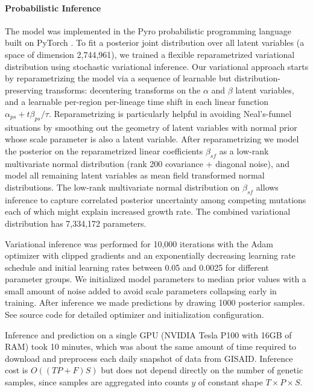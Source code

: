 \documentclass[12pt]{article}
\begin{document}
\paragraph*{Probabilistic Inference}

The model was implemented in the Pyro probabilistic programming language \cite{bingham2019pyro} built on PyTorch \cite{paszke2017automatic}.
To fit a posterior joint distribution over all latent variables (a space of dimension 2,744,961), we trained a flexible reparametrized variational distribution using stochastic variational inference.
Our variational approach starts by reparametrizing the model via a sequence of learnable but distribution-preserving transforms: decentering transforms \cite{gorinova2020automatic} on the $\alpha$ and $\beta$ latent variables, and a learnable per-region per-lineage time shift in each linear function $\alpha_{ps}+t\beta_{ps}/\tau$.
Reparametrizing is particularly helpful in avoiding Neal's-funnel situations \cite{neal2003slice} by smoothing out the geometry of latent variables with normal prior whose scale parameter is also a latent variable.
After reparametrizing we model the posterior on the reparametrized linear coefficients $\beta_{sf}$ as a low-rank multivariate normal distribution (rank 200 covariance + diagonal noise), and model all remaining latent variables as mean field transformed normal distributions.
The low-rank multivariate normal distribution on $\beta_{sf}$ allows inference to capture correlated posterior uncertainty among competing mutations each of which might explain increased growth rate.
The combined variational distribution has 7,334,172 parameters.

Variational inference was performed for 10,000 iterations with the Adam optimizer with clipped gradients and an exponentially decreasing learning rate schedule and initial learning rates between 0.05 and 0.0025 for different parameter groups.
We initialized model parameters to median prior values with a small amount of noise added to avoid scale parameters collapsing early in training.
After inference we made predictions by drawing 1000 posterior samples.
See source code for detailed optimizer and initialization configuration.

Inference and prediction on a single GPU (NVIDIA Tesla P100 with 16GB of RAM) took 10 minutes, which was about the same amount of time required to download and preprocess each daily snapshot of data from GISAID.
Inference cost is $O((TP+F)S)$ but does not depend directly on the number of genetic samples, since samples are aggregated into counts $y$ of constant shape $T\times P\times S$.
\end{document}
